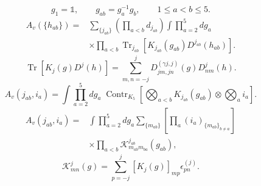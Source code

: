 \documentclass{article}
\newcommand{\Contr}{\operatorname{Contr}}
\newcommand{\Tr}{\operatorname{Tr}}
\begin{document}
\begin{equation}
g_1=\mathbb1,\qquad g_{ab}=g_a^{-1}g_b,\qquad1\le a<b\le5.
\tag{D3}
\end{equation}
\begin{equation}
\begin{aligned}
A_v(\{h_{ab}\})={}&\sum_{\{j_{ab}\}}\left(\prod_{a<b}d_{j_{ab}}\right)\int\prod_{a=2}^5dg_a\\
&\times\prod_{a<b}\Tr_{j_{ab}}\left[K_{j_{ab}}(g_{ab})D^{j_{ab}}(h_{ab})\right].
\end{aligned}
\tag{D4}
\end{equation}
\begin{equation}
\Tr[K_j(g)D^j(h)]=\sum_{m,n=-j}^j D^{(\gamma j,j)}_{jm,jn}(g)D^j_{nm}(h).
\tag{D5}
\end{equation}
\begin{equation}
A_v(j_{ab},i_a)=\int\prod_{a=2}^5dg_a\;\Contr_{K_5}\left[\bigotimes_{a<b}K_{j_{ab}}(g_{ab})\otimes\bigotimes_ai_a\right].
\tag{D6}
\end{equation}
\begin{equation}
\begin{aligned}
A_v(j_{ab},i_a)={}&\int\prod_{a=2}^5dg_a\sum_{\{m_{ab}\}}\left[\prod_a(i_a)_{\{m_{ab}\}_{b\ne a}}\right]\\
&\times\prod_{a<b}\mathcal K^{j_{ab}}_{m_{ab}m_{ba}}(g_{ab}),
\end{aligned}
\tag{D7}
\end{equation}
\begin{equation}
\mathcal K^j_{mn}(g)=\sum_{p=-j}^j[K_j(g)]_{mp}\epsilon^{(j)}_{pn}.
\tag{D8}
\end{equation}
\end{document}
